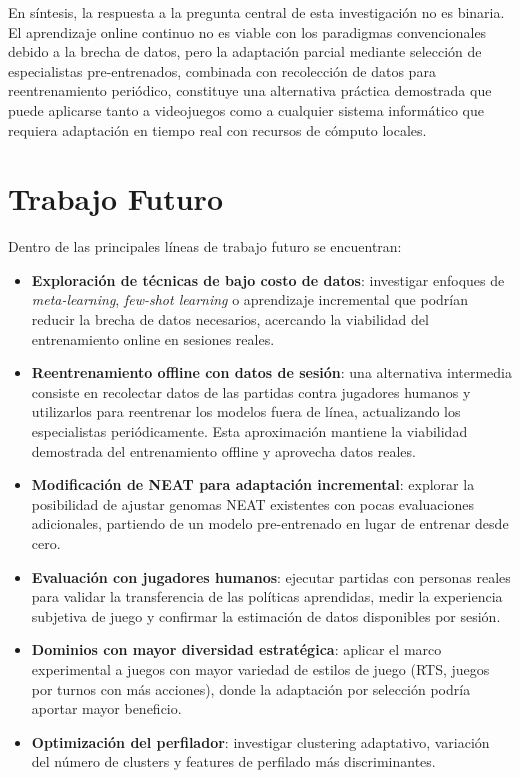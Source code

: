 En síntesis, la respuesta a la pregunta central de esta investigación no es binaria. El aprendizaje online continuo no es viable con los paradigmas convencionales debido a la brecha de datos, pero la adaptación parcial mediante selección de especialistas pre-entrenados, combinada con recolección de datos para reentrenamiento periódico, constituye una alternativa práctica demostrada que puede aplicarse tanto a videojuegos como a cualquier sistema informático que requiera adaptación en tiempo real con recursos de cómputo locales.

\section{Trabajo Futuro}

Dentro de las principales líneas de trabajo futuro se encuentran:

\begin{itemize}
    \item \textbf{Exploración de técnicas de bajo costo de datos}: investigar enfoques de \textit{meta-learning}, \textit{few-shot learning} o aprendizaje incremental que podrían reducir la brecha de datos necesarios, acercando la viabilidad del entrenamiento online en sesiones reales.
    \item \textbf{Reentrenamiento offline con datos de sesión}: una alternativa intermedia consiste en recolectar datos de las partidas contra jugadores humanos y utilizarlos para reentrenar los modelos fuera de línea, actualizando los especialistas periódicamente. Esta aproximación mantiene la viabilidad demostrada del entrenamiento offline y aprovecha datos reales.
    \item \textbf{Modificación de NEAT para adaptación incremental}: explorar la posibilidad de ajustar genomas NEAT existentes con pocas evaluaciones adicionales, partiendo de un modelo pre-entrenado en lugar de entrenar desde cero.
    \item \textbf{Evaluación con jugadores humanos}: ejecutar partidas con personas reales para validar la transferencia de las políticas aprendidas, medir la experiencia subjetiva de juego y confirmar la estimación de datos disponibles por sesión.
    \item \textbf{Dominios con mayor diversidad estratégica}: aplicar el marco experimental a juegos con mayor variedad de estilos de juego (RTS, juegos por turnos con más acciones), donde la adaptación por selección podría aportar mayor beneficio.
    \item \textbf{Optimización del perfilador}: investigar clustering adaptativo, variación del número de clusters y features de perfilado más discriminantes.
\end{itemize}

